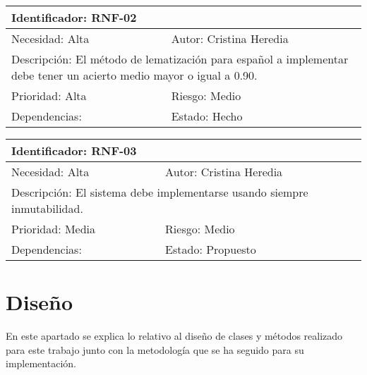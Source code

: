 \begin{table}[H]
\label{my-label}
\begin{tabular}{|l|l|l|l|l|l|l|}
\hline
\multicolumn{7}{|l|}{\textcolor{SchoolColor}{Identificador:} RNF-02}                                 \\ \hline
\multicolumn{4}{|l|}{\textcolor{SchoolColor}{Necesidad:} Alta} & \multicolumn{3}{l|}{\textcolor{SchoolColor}{Autor:} Cristina Heredia}         \\ \hline
\multicolumn{7}{|L|}{\textcolor{SchoolColor}{Descripción:} El método de lematización para español a implementar debe tener un acierto medio mayor o igual a 0.90. }                                 \\ \hline
\multicolumn{4}{|l|}{\textcolor{SchoolColor}{Prioridad: }Alta} & \multicolumn{3}{l|}{\textcolor{SchoolColor}{Riesgo:} Medio}         \\ \hline
\multicolumn{5}{|l|}{\textcolor{SchoolColor}{Dependencias: } }         & \multicolumn{2}{l|}{\textcolor{SchoolColor}{Estado:} Hecho} \\ \hline
\end{tabular}
\end{table}

\begin{table}[H]
\label{my-label}
\begin{tabular}{|l|l|l|l|l|l|l|}
\hline
\multicolumn{7}{|l|}{\textcolor{SchoolColor}{Identificador:} RNF-03}                                 \\ \hline
\multicolumn{4}{|l|}{\textcolor{SchoolColor}{Necesidad:} Alta} & \multicolumn{3}{l|}{\textcolor{SchoolColor}{Autor:} Cristina Heredia}         \\ \hline
\multicolumn{7}{|L|}{\textcolor{SchoolColor}{Descripción:} El sistema debe implementarse usando siempre
inmutabilidad. }                                 \\ \hline
\multicolumn{4}{|l|}{\textcolor{SchoolColor}{Prioridad: } Media} & \multicolumn{3}{l|}{\textcolor{SchoolColor}{Riesgo:} Medio}         \\ \hline
\multicolumn{5}{|l|}{\textcolor{SchoolColor}{Dependencias: } }         & \multicolumn{2}{l|}{\textcolor{SchoolColor}{Estado:} Propuesto} \\ \hline
\end{tabular}
\end{table}

\chapter*{Diseño}
En este apartado se explica lo relativo al diseño de clases y métodos realizado para este trabajo junto con la metodología que se ha seguido para su implementación. \newline

